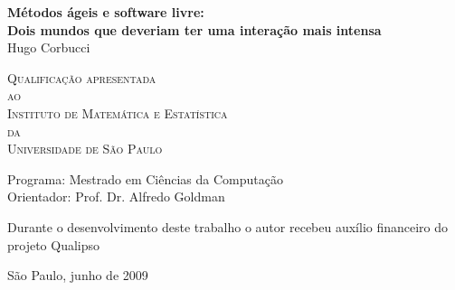 \documentclass[12pt,twoside,letterpaper]{book}
\begin{document}
\frontmatter \onehalfspacing  %

\thispagestyle{empty}
\begin{center}
    \vspace*{2.3cm}
    \textbf{\Large{Métodos ágeis e software livre:\\
        Dois mundos que deveriam ter uma interação mais intensa}}\\
	
    \vspace*{1.2cm}
    \Large{Hugo Corbucci}
    
    \vskip 2cm
	\textsc{
	Qualificação apresentada\\[-0.25cm] 
	ao\\[-0.25cm]
	Instituto de Matemática e Estatística\\[-0.25cm]
	da\\[-0.25cm]
	Universidade de São Paulo}
    
    \vskip 1.5cm
    Programa: Mestrado em Ciências da Computação\\
    Orientador: Prof. Dr. Alfredo Goldman

    \vskip 1cm
	\normalsize{Durante o desenvolvimento deste trabalho o autor recebeu auxílio
	financeiro do projeto Qualipso}
	
    \vskip 0.5cm
    \normalsize{São Paulo, junho de 2009}
\end{center}

%
%
%
%
%	
%	  
\end{document}

